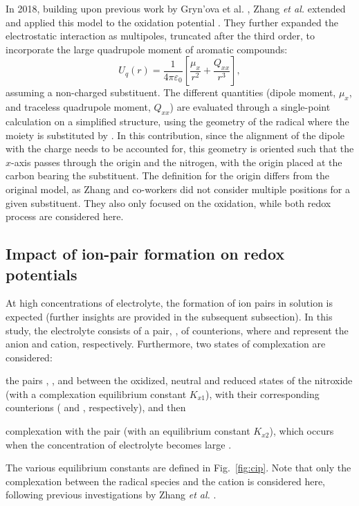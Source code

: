 \documentclass[review,preprint]{elsarticle}
\begin{document}
In 2018, building upon previous work by Gryn'ova et al. \cite{grynovaOriginScopeLongRange2013,grynovaSwitchingRadicalStability2013}, Zhang \textit{et al.} extended and applied this model to the oxidation potential \cite{zhangEffectHeteroatomFunctionality2018}. They further expanded the electrostatic interaction as multipoles, truncated after the third order, to incorporate the large quadrupole moment of aromatic compounds:
\begin{equation}
	U_q(r) =\frac{1}{4\pi\varepsilon_0} \left[\frac{\mu_x}{r^2} + \frac{Q_{xx}}{r^3}\right], \label{eq:Er}
\end{equation}
assuming a non-charged substituent. The different quantities (dipole moment, $\mu_x$, and traceless quadrupole moment, $Q_{xx}$) are evaluated through a single-point calculation on a simplified structure, using the geometry of the radical where the  moiety is substituted by . In this contribution, since the alignment of the dipole with the charge needs to be accounted for, this geometry is oriented such that the $x$-axis passes through the origin and the nitrogen, with the origin placed at the carbon bearing the substituent. The definition for the origin differs from the original model, as Zhang and co-workers did not consider multiple positions for a given substituent. They also only focused on the oxidation, while both redox process are considered here.


\subsection{Impact of ion-pair formation on redox potentials}

At high concentrations of electrolyte, the formation of ion pairs in solution is expected (further insights are provided in the subsequent subsection). In this study, the electrolyte consists of a pair, , of counterions, where  and  represent the anion and cation, respectively. Furthermore, two states of complexation are considered: \begin{inparaenum}[(i)]
	\item the pairs , , and  between the oxidized, neutral and reduced states of the nitroxide  (with a complexation equilibrium constant $K_{x1}$), with their corresponding counterions ( and , respectively), and then
	\item complexation with the  pair (with an equilibrium constant $K_{x2}$), which occurs when the concentration of electrolyte becomes large \cite{wylieImprovedPerformanceAllOrganic2019a}.
\end{inparaenum}
The various equilibrium constants are defined in Fig.~\ref{fig:cip}. Note that only the complexation between the radical species and the cation is considered here, following previous investigations by Zhang \textit{et al.} \cite{zhangInteractionsImidazoliumBasedIonic2016,zhangEffectHeteroatomFunctionality2018}.
\end{document}
